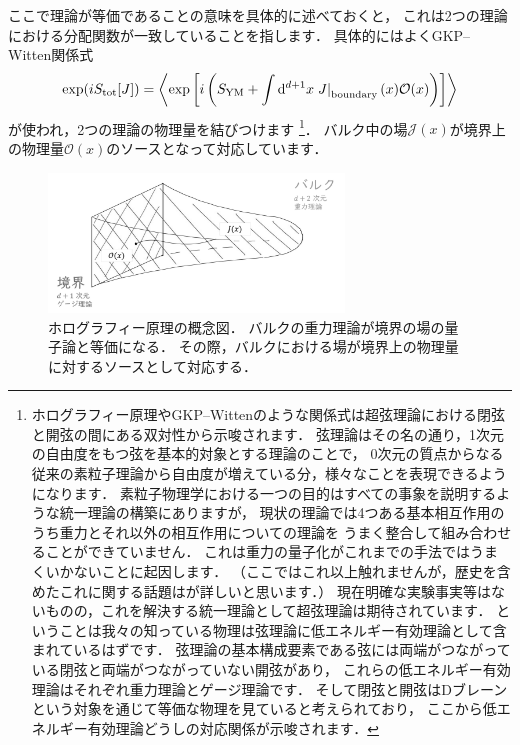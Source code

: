 \documentclass[b5paper,11pt,dvipdfmx]{jsarticle}
\numberwithin{equation}{section}
\theoremstyle{definition}
\begin{document}
ここで理論が等価であることの意味を具体的に述べておくと，
これは2つの理論における分配関数が一致していることを指します．
具体的にはよくGKP--Witten関係式\cite{Gubser98,Witten98}
\begin{equation}
    \exp(i S_{\text{tot}}[J])
    = \ev{\exp\left[ i \left( S_{\text{YM}}
    + \int \dd^{d+1} x \left. J \right|_{\text{boundary}} (x) \mathcal{O}(x) \right)\right]}
\end{equation}
が使われ，2つの理論の物理量を結びつけます
\footnote{ホログラフィー原理やGKP--Wittenのような関係式は超弦理論における閉弦と開弦の間にある双対性から示唆されます．
弦理論はその名の通り，1次元の自由度をもつ弦を基本的対象とする理論のことで，
0次元の質点からなる従来の素粒子理論から自由度が増えている分，様々なことを表現できるようになります．
素粒子物理学における一つの目的はすべての事象を説明するような統一理論の構築にありますが，
現状の理論では4つある基本相互作用のうち重力とそれ以外の相互作用についての理論を
うまく整合して組み合わせることができていません．
これは重力の量子化がこれまでの手法ではうまくいかないことに起因します．
（ここではこれ以上触れませんが，歴史を含めたこれに関する話題は\cite{Yoneya21}が詳しいと思います．）
現在明確な実験事実等はないものの，これを解決する統一理論として超弦理論は期待されています．
ということは我々の知っている物理は弦理論に低エネルギー有効理論として含まれているはずです．
弦理論の基本構成要素である弦には両端がつながっている閉弦と両端がつながっていない開弦があり，
これらの低エネルギー有効理論はそれぞれ重力理論とゲージ理論です．
そして閉弦と開弦はDブレーンという対象を通じて等価な物理を見ていると考えられており，
ここから低エネルギー有効理論どうしの対応関係が示唆されます．}．
バルク中の場$\mathcal{J}(x)$が境界上の物理量$\mathcal{O}(x)$のソースとなって対応しています．
\begin{figure}[t]
    \centering
    \includegraphics[width=0.7\textwidth]{fig_kawai/holography_bw.png}
    \caption{ホログラフィー原理の概念図．
    バルクの重力理論が境界の場の量子論と等価になる．
    その際，バルクにおける場が境界上の物理量に対するソースとして対応する．}
    \label{fig:holography}
\end{figure}
\end{document}
